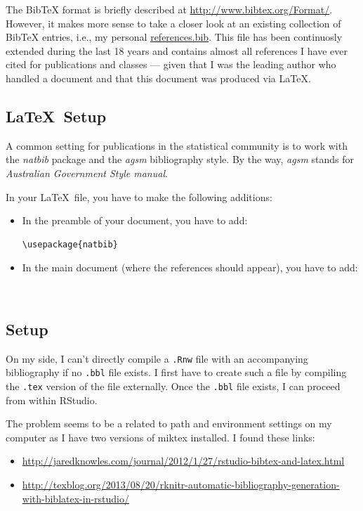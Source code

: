 \documentclass[12pt]{article}
\begin{document}
The BibTeX format is briefly described at \url{http://www.bibtex.org/Format/}.
However, it makes more sense to take a closer look at an existing
collection of BibTeX entries, i.e., my personal
\url{references.bib}.
This file has been continuosly extended during the last 18 years and
contains almost all references I have ever cited for publications
and classes --- given that I was the leading author who handled a
document and that this document was produced via \LaTeX.


\subsection{\LaTeX\ Setup}

A common setting for publications in the statistical community is to work
with the {\it natbib} package and the {\it agsm} bibliography style.
By the way, {\it agsm} stands for {\it Australian Government Style manual}.
 
In your \LaTeX\ file, you have to make the following additions:
\begin{itemize}

\item In the preamble of your document, you have to add:
\begin{verbatim}
\usepackage{natbib}
\end{verbatim}

\item In the main document (where the references should appear), you have to add:
\begin{verbatim}


\end{verbatim}
\end{itemize}


\subsection{Setup}

On my side, I can't directly compile a \verb|.Rnw| file with an accompanying
bibliography if no \verb|.bbl| file exists. I first have to create
such a file by compiling the \verb|.tex| version of the file externally.
Once the \verb|.bbl| file exists, I can proceed from within RStudio.

The problem seems to be a related to path and environment settings
on my computer as I have two versions of miktex installed. I found these links:
\begin{itemize}
\item \url{http://jaredknowles.com/journal/2012/1/27/rstudio-bibtex-and-latex.html}

\item \url{http://texblog.org/2013/08/20/rknitr-automatic-bibliography-generation-with-biblatex-in-rstudio/}
\end{itemize}
\end{document}
